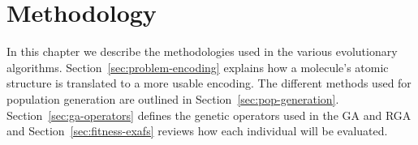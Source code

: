 \chapter{Methodology}

In this chapter we describe the methodologies used in the various evolutionary algorithms. Section~\ref{sec:problem-encoding} explains how a molecule's atomic structure is translated to a more usable encoding. The different methods used for population generation are outlined in Section~\ref{sec:pop-generation}. Section~\ref{sec:ga-operators} defines the genetic operators used in the GA and RGA and Section~\ref{sec:fitness-exafs} reviews how each individual will be evaluated.





% 